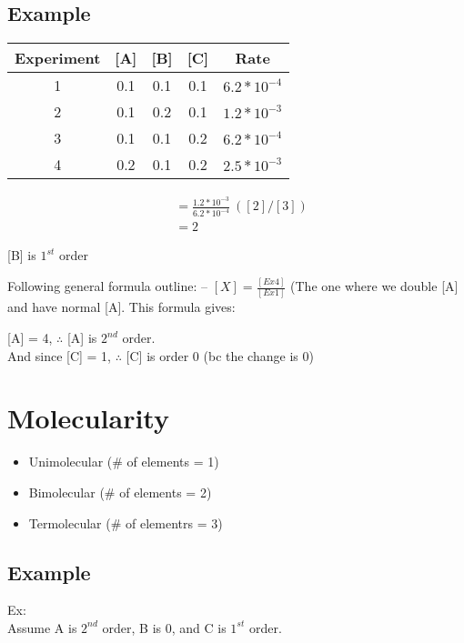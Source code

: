 \documentclass{article}
\begin{document}
\pagebreak
\subsection{Example}

\begin{center}
\begin{tabular}{|c|c|c|c|c|}
\hline
Experiment & [A] & [B] & [C] & Rate \\
\hline \hline
1 & 0.1 & 0.1 & 0.1 & $6.2*10^{-4}$\\
\hline
2 & 0.1 & 0.2 & 0.1 & $1.2*10^{-3}$\\
\hline
3 & 0.1 & 0.1 & 0.2 & $6.2*10^{-4}$\\
\hline
4 & 0.2 & 0.1 & 0.2 & $2.5*10^{-3}$\\
\hline
\end{tabular}
\end{center}

\begin{align*}
[B] & = \frac{1.2*10^{-3}}{6.2*10^{-4}}\ ([2]/[3])\\
&= 2
\end{align*}

[B] is $1^{st}$ order

Following general formula outline: -- $[X] = \frac{[Ex4]}{[Ex1]}$ (The one where we double [A] and have normal [A]. This formula gives:

[A] = 4, $\therefore$ [A] is $2^{nd}$ order.\\
And since [C] = 1, $\therefore$ [C] is order 0 (bc the change is 0)




\pagebreak
\section{Molecularity}
\begin{itemize}
\item Unimolecular (\# of elements = 1)
\item Bimolecular (\# of elements = 2)
\item Termolecular (\# of elementrs = 3)
\end{itemize}

\subsection{Example}
Ex: \\Assume A is $2^{nd}$ order, B is 0, and C is $1^{st}$ order.
\end{document}
